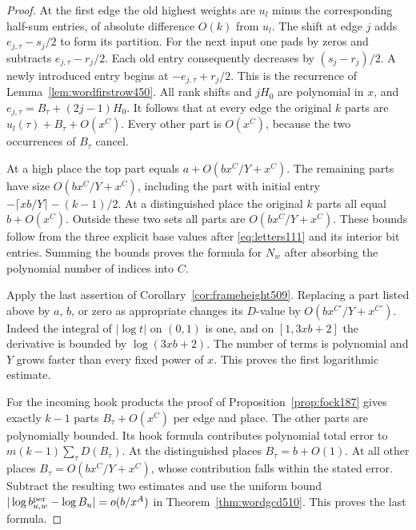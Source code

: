 \documentclass[a4paper,11pt]{article}
\theoremstyle{definition}
\theoremstyle{remark}
\numberwithin{equation}{section}
\begin{document}
\begin{proof}
At the first edge the old highest weights are \(u_l\) minus
the corresponding half-sum entries, of absolute difference
\(O(k)\) from \(u_l\). The shift at edge \(j\) adds
\(e_{j,\tau}-s_j/2\) to form its partition. For the next input
one pads by zeros and subtracts \(e_{j,\tau}-r_j/2\).
Each old entry consequently decreases by \((s_j-r_j)/2\).
A newly introduced entry begins at \(-e_{j,\tau}+r_j/2\).
This is the recurrence of Lemma~\ref{lem:wordfirstrow450}.
All rank shifts and \(jH_0\) are polynomial in \(x\), and
\(e_{j,\tau}=B_\tau+(2j-1)H_0\). It follows that at every edge
the original \(k\) parts are \(u_l(\tau)+B_\tau+O(x^C)\).
Every other part is \(O(x^C)\), because the two occurrences
of \(B_\tau\) cancel.

At a high place the top part equals \(a+O(bx^C/Y+x^C)\).
The remaining parts have size \(O(bx^C/Y+x^C)\), including
the part with initial entry \(-\lceil xb/Y\rceil-(k-1)/2\).
At a distinguished place the original \(k\) parts all equal
\(b+O(x^C)\). Outside these two sets all parts are
\(O(bx^C/Y+x^C)\). These bounds follow from the three explicit
base values after \eqref{eq:letters111} and its interior bit
entries. Summing the bounds proves the formula for \(N_w\)
after absorbing the polynomial number of indices into \(C\).

Apply the last assertion of Corollary~\ref{cor:frameheight509}.
Replacing a part listed above by \(a\), \(b\), or zero as
appropriate changes its \(D\)-value by \(O(bx^{C'}/Y+x^{C'})\).
Indeed the integral of \(|\log t|\) on \((0,1)\) is one,
and on \([1,3xb+2]\) the derivative is bounded by
\(\log(3xb+2)\). The number of terms is polynomial and
\(Y\) grows faster than every fixed power of \(x\). This proves
the first logarithmic estimate.

For the incoming hook products the proof of
Proposition~\ref{prop:fock187} gives exactly \(k-1\) parts
\(B_\tau+O(x^C)\) per edge and place. The other parts are
polynomially bounded. Its hook formula contributes polynomial
total error to \(m(k-1)\sum_\tau D(B_\tau)\). At the
distinguished places \(B_\tau=b+O(1)\). At all other places
\(B_\tau=O(bx^C/Y+x^C)\), whose contribution falls within
the stated error. Subtract the resulting two estimates
and use the uniform bound
\(|\log b^{\rm per}_{u,w}-\log B_u|=o(b/x^A)\) in
Theorem~\ref{thm:wordgcd510}. This proves the last formula.
\end{proof}
\end{document}
